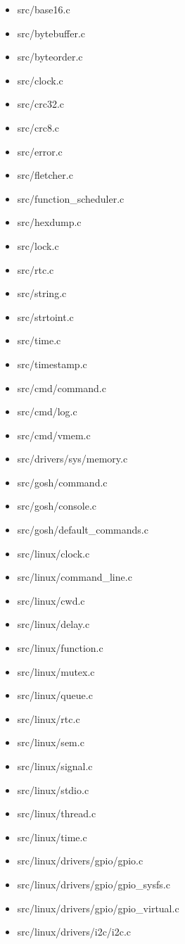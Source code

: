 \begin{itemize}
	\item src/base16.c
	\item src/bytebuffer.c
	\item src/byteorder.c
	\item src/clock.c
	\item src/crc32.c
	\item src/crc8.c
	\item src/error.c
	\item src/fletcher.c
	\item src/function\_scheduler.c
	\item src/hexdump.c
	\item src/lock.c
	\item src/rtc.c
	\item src/string.c
	\item src/strtoint.c
	\item src/time.c
	\item src/timestamp.c
	\item src/cmd/command.c
	\item src/cmd/log.c
	\item src/cmd/vmem.c
	\item src/drivers/sys/memory.c
	\item src/gosh/command.c
	\item src/gosh/console.c
	\item src/gosh/default\_commands.c
	\item src/linux/clock.c
	\item src/linux/command\_line.c
	\item src/linux/cwd.c
	\item src/linux/delay.c
	\item src/linux/function.c
	\item src/linux/mutex.c
	\item src/linux/queue.c
	\item src/linux/rtc.c
	\item src/linux/sem.c
	\item src/linux/signal.c
	\item src/linux/stdio.c
	\item src/linux/thread.c
	\item src/linux/time.c
	\item src/linux/drivers/gpio/gpio.c
	\item src/linux/drivers/gpio/gpio\_sysfs.c
	\item src/linux/drivers/gpio/gpio\_virtual.c
	\item src/linux/drivers/i2c/i2c.c

\end{itemize}
